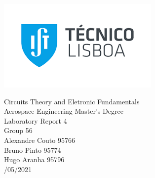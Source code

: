 
\thispagestyle {empty}

\includegraphics[bb=-2.5cm 5cm 0cm 0cm,scale=1.00]{../figlib/index.png}

\begin{center}
%
\vspace{3.0cm}

\vspace{1cm}
{\FontLb Circuits Theory and Eletronic Fundamentals} \\ %
\vspace{1cm}
{\FontSn Aerospace Engineering Master's Degree} \\ %
\vspace{1cm}
{\FontSn Laboratory  Report 4} \\ 
\vspace{1cm}
{\FontSn Group 56 } \\
\vspace{1cm}
{\FontSn Alexandre Couto 95766} \\
\vspace{0.1cm}
{\FontSn Bruno Pinto     95774} \\
\vspace{0.1cm}
{\FontSn Hugo Aranha     95796} \\
\vspace{0.5cm}
{/05/2021} \\ %
%
\end{center}
\newpage
